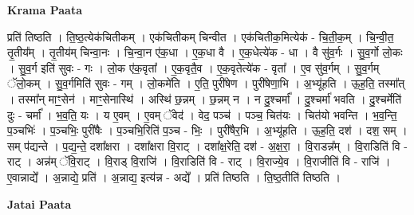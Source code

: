 \documentclass[17pt]{extarticle}
\begin{document}
\textbf{Krama Paata} \newline

प्रति॑ तिष्ठति । ति॒ष्ठ॒त्येक॑चितीकम् । एक॑चितीकम् चिन्वीत । एक॑चितीक॒मित्येक॑ - चि॒ती॒क॒म् । चि॒न्वी॒त॒ तृ॒तीय᳚म् । तृ॒तीय॑म् चिन्वा॒नः । चि॒न्वा॒न ए॑क॒धा । ए॒क॒धा वै । ए॒क॒धेत्ये॑क - धा । वै सु॑व॒र्गः । सु॒व॒र्गो लो॒कः । सु॒व॒र्ग इति॑ सुवः - गः । लो॒क ए॑क॒वृता᳚ । ए॒क॒वृतै॒व । ए॒क॒वृतेत्ये॑क - वृता᳚ । ए॒व सु॑व॒र्गम् । सु॒व॒र्गम् ॅलो॒कम् । सु॒व॒र्गमिति॑ सुवः - गम् । लो॒कमे॑ति । ए॒ति॒ पुरी॑षेण । पुरी॑षेणा॒भि । अ॒भ्यू॑हति । ऊ॒ह॒ति॒ तस्मा᳚त् । तस्मा᳚न् माꣳ॒॒सेन॑ । माꣳ॒॒सेनास्थि॑ । अस्थि॑ छ॒न्नम् । छ॒न्नम् न । न दु॒श्चर्मा᳚ । दु॒श्चर्मा॑ भवति । दु॒श्चर्मेति॑ दुः - चर्मा᳚ । भ॒व॒ति॒ यः । य ए॒वम् । ए॒वम् ॅवेद॑ । वेद॒ पञ्च॑ । पञ्च॒ चित॑यः । चित॑यो भवन्ति । भ॒व॒न्ति॒ प॒ञ्चभिः॑ । प॒ञ्चभिः॒ पुरी॑षैः । प॒ञ्चभि॒रिति॑ प॒ञ्च - भिः॒ । पुरी॑षैर॒भि । अ॒भ्यू॑हति । ऊ॒ह॒ति॒ दश॑ । दश॒ सम् । सम् प॑द्यन्ते । प॒द्य॒न्ते॒ दशा᳚क्षरा । दशा᳚क्षरा वि॒राट् । दशा᳚क्ष॒रेति॒ दश॑ - अ॒क्ष॒रा॒ । वि॒राडन्न᳚म् । वि॒राडिति॑ वि - राट् । अन्न॑म् ॅवि॒राट् । वि॒राड् वि॒राजि॑ । वि॒राडिति॑ वि - राट् । वि॒राज्ये॒व । वि॒राजीति॑ वि - राजि॑ । ए॒वान्नाद्ये᳚ । अ॒न्नाद्ये॒ प्रति॑ । अ॒न्नाद्य॒ इत्य॑न्न - अद्ये᳚ । प्रति॑ तिष्ठति । ति॒ष्ठ॒तीति॑ तिष्ठति । \newline

\textbf{Jatai Paata} \newline
\end{document}
